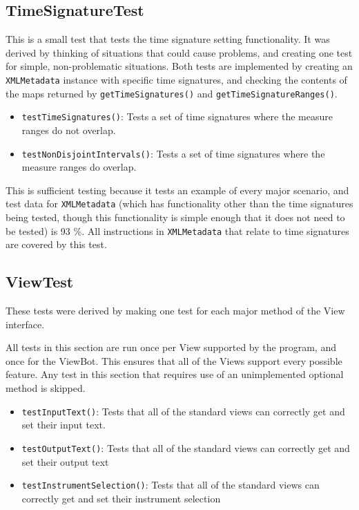 \documentclass[11pt]{article}
\begin{document}
\subsection{TimeSignatureTest}
\label{sec:org6b85e8c}
This is a small test that tests the time signature setting functionality.  It was derived by thinking of situations that could cause problems, and creating one test for simple, non-problematic situations.  Both tests are implemented by creating an \texttt{XMLMetadata} instance with specific time signatures, and checking the contents of the maps returned by \texttt{getTimeSignatures()} and \texttt{getTimeSignatureRanges()}.
\begin{itemize}
\item \texttt{testTimeSignatures()}: Tests a set of time signatures where the measure ranges do not overlap.
\item \texttt{testNonDisjointIntervals()}: Tests a set of time signatures where the measure ranges do overlap.
\end{itemize}

This is sufficient testing because it tests an example of every major scenario, and test data for \texttt{XMLMetadata} (which has functionality other than the time signatures being tested, though this functionality is simple enough that it does not need to be tested) is 93 \%.  All instructions in \texttt{XMLMetadata} that relate to time signatures are covered by this test.
\subsection{ViewTest}
\label{sec:org0f356cd}
These tests were derived by making one test for each major method of the View interface.

All tests in this section are run once per View supported by the program, and once for the ViewBot.  This ensures that all of the Views support every possible feature.  Any test in this section that requires use of an unimplemented optional method is skipped.  

\begin{itemize}
\item \texttt{testInputText()}: Tests that all of the standard views can correctly get and set their input text.
\item \texttt{testOutputText()}: Tests that all of the standard views can correctly get and set their output text
\item \texttt{testInstrumentSelection()}: Tests that all of the standard views can correctly get and set their instrument selection
\end{itemize}
\end{document}
